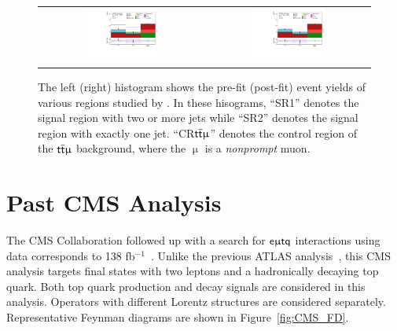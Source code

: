\begin{figure}[tbh!]
 \begin{center}
 \begin{tabular}{cc}
 \includegraphics[width=0.48\textwidth]{figures/Part3/History/ATLAS_results3}&
 \includegraphics[width=0.48\textwidth]{figures/Part3/History/ATLAS_results4}\\
 \end{tabular}
 \caption{The left (right) histogram shows the pre-fit (post-fit) event yields of various regions studied by \cite{ATLAS-CONF-2023-001}. In these hisograms, ``SR1'' denotes the signal region with two or more jets while ``SR2'' denotes the signal region with exactly one jet. ``CR$\textsf{t}\overline{\textsf{t}}\upmu$'' denotes the control region of the $\textsf{t}\overline{\textsf{t}}\upmu$ background, where the $\upmu$ is a \emph{nonprompt} muon.}
 \label{fig:ATLAS_results2}
 \end{center}
\end{figure}
\section{Past CMS Analysis}
\label{sec:CLFV_CMS}

The \ac{CMS} Collaboration followed up with a search for $\textsf{e}\upmu\textsf{t{q}}$ interactions using data corresponds to 138 fb$^{-1}$~\cite{CMS:2022ztx}. Unlike the previous \ac{ATLAS} analysis~\cite{ATLAS-CONF-2018-044}, this \ac{CMS} analysis targets final states with two leptons and a hadronically decaying top quark. Both top quark production and decay signals are considered in this analysis. Operators with different Lorentz structures are considered separately. Representative Feynman diagrams are shown in Figure~\ref{fig:CMS_FD}. 


